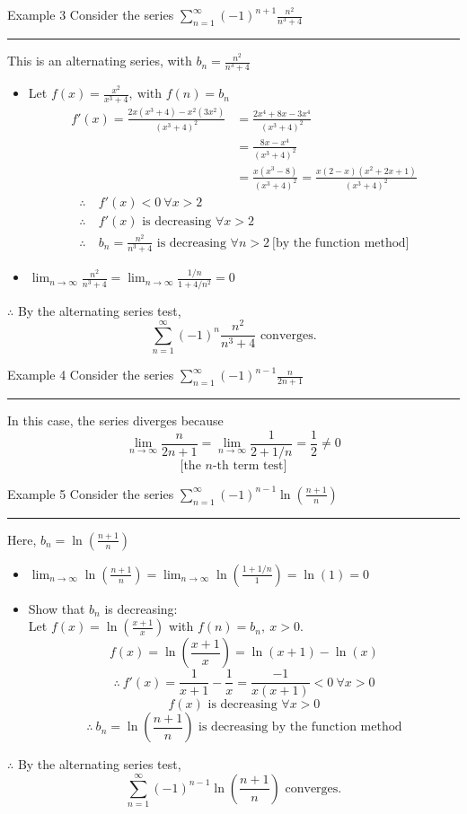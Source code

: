 \documentclass[12pt,a4paper]{article}
\begin{document}
\begin{eg}{Example 3}
	Consider the series $\displaystyle\sum_{n=1}^\infty (-1)^{n+1}\frac{n^2}{n^3+4}$\\
	\noindent\rule[0.25\baselineskip]{\textwidth}{1pt}
	This is an alternating series, with $\displaystyle b_n=\frac{n^2}{n^3+4}$
	\begin{itemize}
		\item Let $\displaystyle f(x)=\frac{x^2}{x^3+4},\ \text{with }f(n)=b_n$
		$$\begin{aligned}
			f'(x)=\frac{2x(x^3+4)-x^2(3x^2)}{(x^3+4)^2}&=\frac{2x^4+8x-3x^4}{(x^3+4)^2}\\
			&=\frac{8x-x^4}{(x^3+4)^2}\\
			&=\frac{x(x^3-8)}{(x^3+4)^2}=\frac{x(2-x)(x^2+2x+1)}{(x^3+4)^2}
		\end{aligned}$$
		$$\begin{aligned}
			\therefore\ &f'(x)<0\ \forall x>2\\
			\therefore\ &f'(x)\text{ is decreasing }\forall x>2\\
			\therefore\ &b_n=\frac{n^2}{n^3+4}\text{ is decreasing }\forall n>2\ \text{[by the function method]}
		\end{aligned}$$
		\item $\displaystyle\lim_{n\to\infty}\frac{n^2}{n^3+4}=\lim_{n\to\infty}\frac{1/n}{1+4/n^2}=0$
	\end{itemize}
	$\therefore$ By the alternating series test, 
	$$\sum_{n=1}^\infty (-1)^n\frac{n^2}{n^3+4}\text{ converges.}$$
\end{eg}
\begin{eg}{Example 4}
	Consider the series $\displaystyle\sum_{n=1}^\infty (-1)^{n-1}\frac{n}{2n+1}$\\
	\noindent\rule[0.25\baselineskip]{\textwidth}{1pt}
	In this case, the series diverges because 
	$$\lim_{n\to\infty}\frac{n}{2n+1}=\lim_{n\to\infty}\frac{1}{2+1/n}=\frac{1}{2}\neq0$$
	$$\text{[the }n\text{-th term test]}$$
\end{eg}
\begin{eg}{Example 5}
	Consider the series $\displaystyle\sum_{n=1}^\infty (-1)^{n-1}\ln\left(\frac{n+1}{n}\right)$\\
	\noindent\rule[0.25\baselineskip]{\textwidth}{1pt}
	Here, $\displaystyle b_n=\ln\left(\frac{n+1}{n}\right)$
	\begin{itemize}
		\item $\displaystyle\lim_{n\to\infty}\ln\left(\frac{n+1}{n}\right)=\lim_{n\to\infty}\ln\left(\frac{1+1/n}{1}\right)=\ln(1)=0$
		\item Show that $b_n$ is decreasing: \\
		Let $\displaystyle f(x)=\ln\left(\frac{x+1}{x}\right)$ with $f(n)=b_n,\ x>0.$
		$$f(x)=\ln\left(\frac{x+1}{x}\right)=\ln(x+1)-\ln(x)$$
		$$\therefore\ f'(x)=\frac{1}{x+1}-\frac{1}{x}=\frac{-1}{x(x+1)}<0\ \forall x>0$$
		$$f(x)\text{ is decreasing }\forall x>0$$
		$$\therefore\ b_n=\ln\left(\frac{n+1}{n}\right)\text{ is decreasing by the function method}$$
	\end{itemize}
	$\therefore$ By the alternating series test,
	$$\sum_{n=1}^\infty(-1)^{n-1}\ln\left(\frac{n+1}{n}\right)\text{ converges.}$$
\end{eg}
\end{document}
